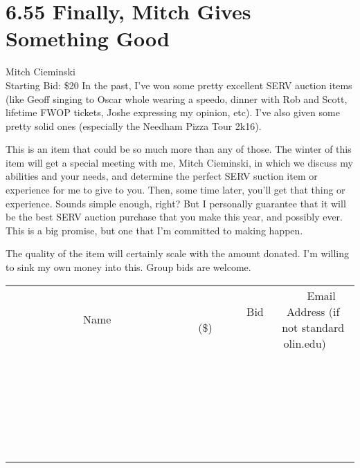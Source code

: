 \documentclass[11pt]{article}
\begin{document}
\section*{6.55 Finally, Mitch Gives Something Good}
Mitch Cieminski
\\
Starting Bid: \$20
\newline
In the past, I've won some pretty excellent SERV auction items (like Geoff singing to Oscar whole wearing a speedo, dinner with Rob and Scott, lifetime FWOP tickets, Joshe expressing my opinion, etc). I've also given some pretty solid ones (especially the Needham Pizza Tour 2k16). 

This is an item that could be so much more than any of those. The winter of this item will get a special meeting with me, Mitch Cieminski, in which we discuss my abilities and your needs, and determine the perfect SERV suction item or experience for me to give to you. Then, some time later, you'll get that thing or experience. Sounds simple enough, right? But I personally guarantee that it will be the best SERV auction purchase that you make this year, and possibly ever. This is a big promise, but one that I'm committed to making happen.

The quality of the item will certainly scale with the amount donated. I'm willing to sink my own money into this. Group bids are welcome.
\\[6ex]
\begin{tabular}{c c c}
~~~~~~~~~~~~~Name~~~~~~~~~~~~~ & ~~~~~~~~~Bid (\$)~~~~~~~~~  & ~~~Email Address (if not standard olin.edu)~~~\\
 & & \\
\hline
 & & \\
\hline
 & & \\
\hline
 & & \\
\hline
 & & \\
\hline
 & & \\
\hline
 & & \\
\hline
 & & \\
\hline
 & & \\
\hline
 & & \\
\hline
 & & \\
\hline
 & & \\
\hline
 & & \\
\hline
 & & \\
\hline
 & & \\
\hline
 & & \\
\hline
 & & \\
\hline
 & & \\
\hline
 & & \\
\hline
 & & \\
\hline
 & & \\
\hline
 & & \\
\hline
 & & \\
\hline
 & & \\
\hline
 & & \\
\hline
 & & \\
\hline
\end{tabular}
\newpage
\end{document}
